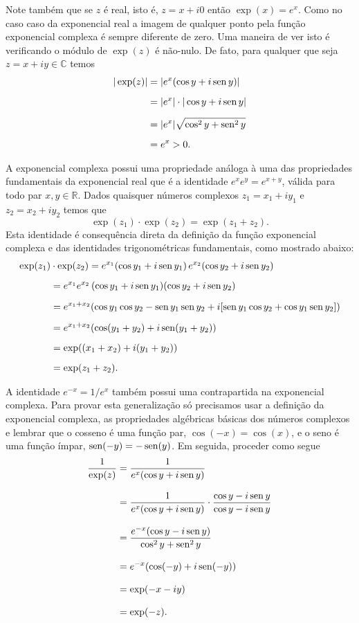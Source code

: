 Note também que se $z$ é real, isto é, $z=x+i0$ então $\exp(x)=e^{x}$.
Como no caso caso da exponencial real a imagem de qualquer ponto pela 
função exponencial complexa é sempre diferente de zero. Uma maneira de 
ver isto é verificando o módulo de $\exp(z)$ é não-nulo. De fato,
para qualquer que seja $z=x+iy\in\mathbb{C}$ temos 
\begin{align*}
|\exp(z)| 
&= 
|e^{x}(\cos y+i\operatorname{sen} y)| 
\\[0.2cm]
&= |e^x|\cdot|\cos y +i\operatorname{sen} y|
\\[0.2cm]
&=
|e^x| \sqrt{\cos^2y+\operatorname{sen}^2y}
\\[0.2cm]
&= e^{x} > 0.
\end{align*}


A exponencial complexa possui uma propriedade análoga à uma das propriedades
fundamentais da exponencial real que é a identidade $e^{x}e^{y}=e^{x+y}$, válida
para todo par $x,y\in\mathbb{R}$. 
Dados quaisquer números complexos $z_1=x_1+iy_1$ e $z_2=x_2+iy_2$ temos que 
\[
\exp(z_1)\cdot \exp(z_2) = \exp(z_1+z_2).
\] 
Esta identidade é consequência direta da definição da função exponencial complexa e 
das identidades trigonométricas fundamentais, como mostrado abaixo:
\begin{align*}
\exp(z_1)&\cdot \exp(z_2)
=
e^{x_1}(\cos y_1+i\operatorname{sen} y_1)
\, 
e^{x_2}(\cos y_2+i\operatorname{sen} y_2)
\\[0.2cm]
&=
e^{x_1}e^{x_2}\, (\cos y_1+i\operatorname{sen} y_1)(\cos y_2+i\operatorname{sen} y_2)
\\[0.2cm]
&=
e^{x_1+x_2}(\cos y_1\cos y_2-\operatorname{sen} y_1\operatorname{sen} y_2 +i [\operatorname{sen} y_1\cos y_2+\cos y_1\operatorname{sen} y_2] )
\\[0.2cm]
&=
e^{x_1+x_2}(\cos(y_1+y_2)+i\operatorname{sen}(y_1+y_2))
\\[0.2cm]
&=
\exp( (x_1+x_2)+i(y_1+y_2) )
\\[0.2cm]
&=
\exp(z_1+z_2).
\end{align*}

A identidade $e^{-x}= 1/e^{x}$ também possui uma contrapartida na exponencial
complexa. Para provar esta generalização só precisamos 
usar a definição da exponencial complexa, as propriedades algébricas básicas
dos números complexos e lembrar que o cosseno é uma função
par, $\cos(-x)=\cos(x)$, e o seno é uma função ímpar, $\operatorname{sen}(-y)=-\operatorname{sen}(y)$.
Em seguida, proceder como segue
\begin{align*}
\frac{1}{\exp(z)}
&=
\frac{1}{e^{x}(\cos y+i\operatorname{sen} y)}
\\[0.3cm]
&=
\frac{1}{e^{x}(\cos y+i\operatorname{sen} y)}\cdot \frac{\cos y-i\operatorname{sen} y}{\cos y-i \operatorname{sen} y}
\\[0.3cm]
&=
\frac{e^{-x}(\cos y-i\operatorname{sen} y)}{\cos^2 y+\operatorname{sen}^2 y}
\\[0.3cm]
&=
e^{-x}(\cos(-y)+i\operatorname{sen}(-y))
\\[0.3cm]
&=
\exp(-x-iy)
\\[0.3cm]
&=
\exp(-z).
\end{align*}

